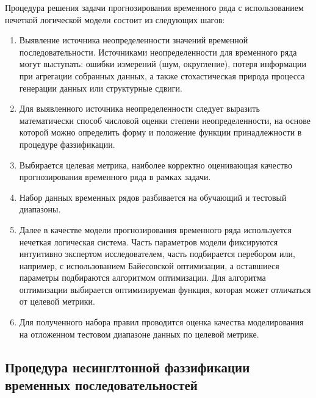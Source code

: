 Процедура решения задачи прогнозирования временного ряда с использованием нечеткой логической модели состоит из следующих шагов:
\begin{enumerate}
	\item Выявление источника неопределенности значений временной последовательности. Источниками неопределенности для временного ряда могут выступать: ошибки измерений (шум, округление), потеря информации при агрегации собранных данных, а также стохастическая природа процесса генерации данных или структурные сдвиги.
	\item Для выявленного источника неопределенности следует выразить математически способ числовой оценки степени неопределенности, на основе которой можно определить форму и положение функции принадлежности в процедуре фаззификации.
	\item Выбирается целевая метрика, наиболее корректно оценивающая качество прогнозирования временного ряда в рамках задачи.
	\item Набор данных временных рядов разбивается на обучающий и тестовый диапазоны.
	\item Далее в качестве модели прогнозирования временного ряда используется нечеткая логическая система. Часть параметров модели фиксируются интуитивно экспертом исследователем, часть подбирается перебором или, например, с использованием Байесовской оптимизации, а оставшиеся параметры подбираются алгоритмом оптимизации. Для алгоритма оптимизации выбирается оптимизируемая функция, которая может отличаться от целевой метрики.
	\item Для полученного набора правил проводится оценка качества моделирования на отложенном тестовом диапазоне данных по целевой метрике.
\end{enumerate}


\subsection{Процедура несинглтонной фаззификации временных последовательностей}

